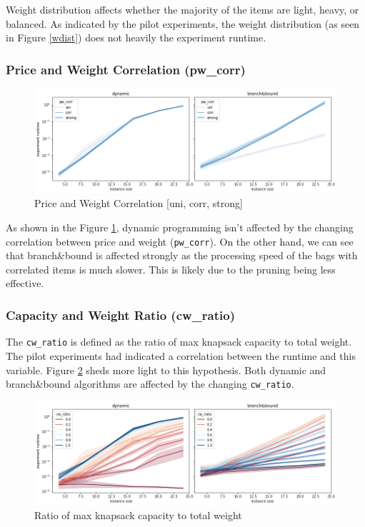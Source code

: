 \documentclass[a4paper,10pt]{article}
\begin{document}
Weight distribution affects whether the majority of the items are light, heavy, or balanced. As indicated by the pilot experiments, the weight distribution (as seen in Figure \ref{wdist}) does not heavily the experiment runtime.

\subsubsection{Price and Weight Correlation (pw\_corr)}

\begin{figure}[!htb]
	\centering
  	\includegraphics[width=\textwidth]{images/pwcorr.png}
	\caption{Price and Weight Correlation [uni, corr, strong]}
	\label{pwcorr}
\end{figure}

As shown in the Figure \ref{pwcorr}, dynamic programming isn't affected by the changing correlation between price and weight (\lstinline{pw_corr}). On the other hand, we can see that branch\&bound is affected strongly as the processing speed of the bags with correlated items is much slower. This is likely due to the pruning being less effective. 

\clearpage

\subsubsection{Capacity and Weight Ratio (cw\_ratio)}

The \lstinline{cw_ratio} is defined as the ratio of max knapsack capacity to total weight. The pilot experiments had indicated a correlation between the runtime and this variable. Figure \ref{cwratio} sheds more light to this hypothesis. Both dynamic and branch\&bound algorithms are affected by the changing \lstinline{cw_ratio}.

\begin{figure}[!htb]
	\centering
  	\includegraphics[width=\textwidth]{images/cwratio.png}
	\caption{Ratio of max knapsack capacity to total weight}
	\label{cwratio}
\end{figure}
\end{document}
